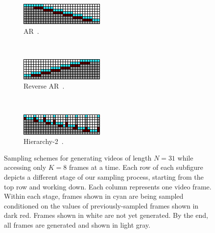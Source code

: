 \begin{figure}[t]
    \centering
    \begin{subfigure}[t]{0.3\textwidth}
        \centering
        \includegraphics[width=\textwidth]{figures/sampling-scheme-visualizations/autoreg.png}
        \caption{AR~\cite{fdm}.}
        \label{fig:ar}
    \end{subfigure}
    ~
    \begin{subfigure}[t]{0.3\textwidth}
        \centering
        \includegraphics[width=\textwidth]{figures/sampling-scheme-visualizations/reverse-autoreg.png}
        \caption{Reverse AR~\cite{fdm}.}
        \label{fig:rev_ar}
    \end{subfigure}
    ~
    \begin{subfigure}[t]{0.3\textwidth}
        \centering
        \includegraphics[width=\textwidth]{figures/sampling-scheme-visualizations/hierarchy-2.png}
        \caption{Hierarchy-2~\cite{fdm}.}
        \label{fig:h2}
    \end{subfigure}
    \caption{Sampling schemes for generating videos of length $N=31$ while accessing only $K=8$ frames at a time. Each row of each subfigure depicts a different stage of our sampling process, starting from the top row and working down. Each column represents one video frame. Within each stage, frames shown in \textcolor{latentcolor}{cyan} are being sampled conditioned on the values of previously-sampled frames shown in \textcolor{observedpastcolor}{dark red}. Frames shown in white are not yet generated. By the end, all frames are generated and shown in \textcolor{completecolor}{light gray}.
    }
    \label{fig:old-sampling-schemes}
\end{figure}


